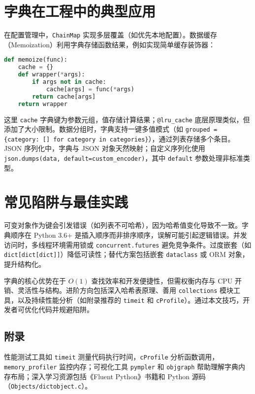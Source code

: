 \chapter{字典在工程中的典型应用}
在配置管理中，\texttt{ChainMap} 实现多层覆盖（如优先本地配置）。数据缓存（Memoization）利用字典存储函数结果，例如实现简单缓存装饰器：\par
\begin{lstlisting}[language=python]
def memoize(func):
    cache = {}
    def wrapper(*args):
        if args not in cache:
            cache[args] = func(*args)
        return cache[args]
    return wrapper
\end{lstlisting}
这里 \texttt{cache} 字典键为参数元组，值存储计算结果；\texttt{@lru\_{}cache} 底层原理类似，但添加了大小限制。数据分组时，字典支持一键多值模式（如 \texttt{grouped = \{{}category: [] for category in categories\}{}}），通过列表存储多个条目。JSON 序列化中，字典与 JSON 对象天然映射；自定义序列化使用 \texttt{json.dumps(data, default=custom\_{}encoder)}，其中 \texttt{default} 参数处理非标准类型。\par
\chapter{常见陷阱与最佳实践}
可变对象作为键会引发错误（如列表不可哈希），因为哈希值变化导致不一致。字典顺序在 Python 3.6+ 是插入顺序而非排序顺序，误解可能引起逻辑错误。并发访问时，多线程环境需用锁或 \texttt{concurrent.futures} 避免竞争条件。过度嵌套（如 \texttt{dict[dict[dict]]}）降低可读性；替代方案包括嵌套 \texttt{dataclass} 或 ORM 对象，提升结构化。\par
字典的核心优势在于 $O(1)$ 查找效率和开发便捷性，但需权衡内存与 CPU 开销、灵活性与结构。进阶方向包括深入哈希表原理、善用 \texttt{collections} 模块工具，以及持续性能分析（如附录推荐的 \texttt{timeit} 和 \texttt{cProfile}）。通过本文技巧，开发者可优化代码并规避陷阱。\par
\section{附录}
性能测试工具如 \texttt{timeit} 测量代码执行时间，\texttt{cProfile} 分析函数调用，\texttt{memory\_{}profiler} 监控内存；可视化工具 \texttt{pympler} 和 \texttt{objgraph} 帮助理解字典内存布局；深入学习资源包括《Fluent Python》书籍和 Python 源码（\texttt{Objects/dictobject.c}）。\par
